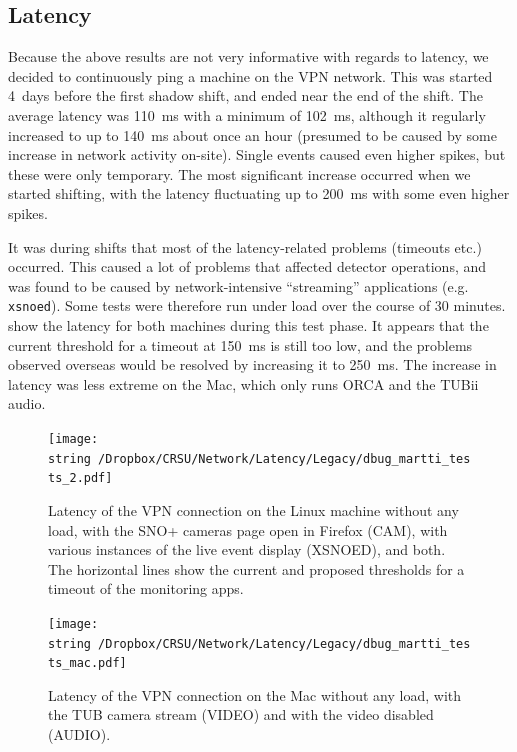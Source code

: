 \documentclass[a4paper,10pt]{article}
\begin{document}
\subsection{Latency}
Because the above results are not very informative with regards to latency, we decided to continuously ping a machine on the VPN network. This was started 4~days before the first shadow shift, and ended near the end of the shift. The average latency was 110~ms with a minimum of 102~ms, although it regularly increased to up to 140~ms about once an hour (presumed to be caused by some increase in network activity on-site). Single events caused even higher spikes, but these were only temporary. The most significant increase occurred when we started shifting, with the latency fluctuating up to 200~ms with some even higher spikes.

It was during shifts that most of the latency-related problems (timeouts etc.) occurred. This caused a lot of problems that affected detector operations, and was found to be caused by network-intensive ``streaming'' applications (e.g. {\tt xsnoed}). Some tests were therefore run under load over the course of 30 minutes.  show the latency for both machines during this test phase. It appears that the current threshold for a timeout at 150~ms is still too low, and the problems observed overseas would be resolved by increasing it to 250~ms. The increase in latency was less extreme on the Mac, which only runs ORCA and the TUBii audio.

\begin{figure}[htp]
	\centering
	\texttt{[image: \\string~/Dropbox/CRSU/Network/Latency/Legacy/dbug\_martti\_tests\_2.pdf]}
	\caption{Latency of the VPN connection on the Linux machine without any load, with the SNO+ cameras page open in Firefox (CAM), with various instances of the live event display (XSNOED), and both. The horizontal lines show the current and proposed thresholds for a timeout of the monitoring apps.}
	\label{load_linux}
\end{figure}

\begin{figure}[htp]
	\centering
	\texttt{[image: \\string~/Dropbox/CRSU/Network/Latency/Legacy/dbug\_martti\_tests\_mac.pdf]}
	\caption{Latency of the VPN connection on the Mac without any load, with the TUB camera stream (VIDEO) and with the video disabled (AUDIO).}
	\label{load_mac}
\end{figure}
\end{document}
